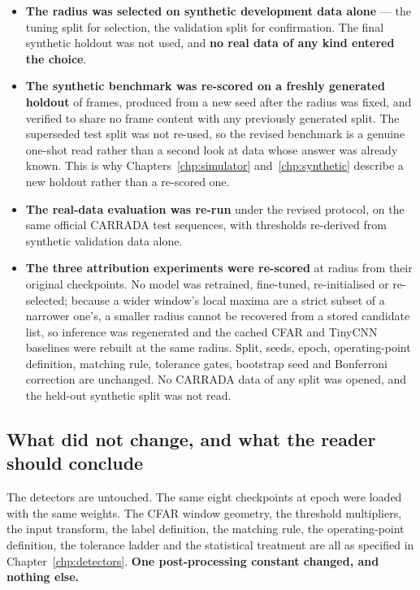 \begin{itemize}
\itemsep2pt
\item \textbf{The radius was selected on synthetic development data alone} --- the tuning split for
selection, the validation split for confirmation. The final synthetic holdout was not used, and
\textbf{no real data of any kind entered the choice}.
\item \textbf{The synthetic benchmark was re-scored on a freshly generated holdout} of
\SynHoldoutFrames{} frames, produced from a new seed after the radius was fixed, and verified to
share no frame content with any previously generated split. The superseded test split was not
re-used, so the revised benchmark is a genuine one-shot read rather than a second look at data whose
answer was already known. This is why Chapters~\ref{chp:simulator} and~\ref{chp:synthetic} describe a
new holdout rather than a re-scored one.
\item \textbf{The real-data evaluation was re-run} under the revised protocol, on the same official
CARRADA test sequences, with thresholds re-derived from synthetic validation data alone.
\item \textbf{The three attribution experiments were re-scored} at radius \ProtocolNms{} from their
original checkpoints. No model was retrained, fine-tuned, re-initialised or re-selected; because a
wider window's local maxima are a strict subset of a narrower one's, a smaller radius cannot be
recovered from a stored candidate list, so inference was regenerated and the cached CFAR and TinyCNN
baselines were rebuilt at the same radius. Split, seeds, epoch, operating-point definition, matching
rule, tolerance gates, bootstrap seed and Bonferroni correction are unchanged. No CARRADA data of any
split was opened, and the held-out synthetic split was not read.
\label{app:attribrescore}
\end{itemize}

\subsection*{What did not change, and what the reader should conclude}

The detectors are untouched. The same eight checkpoints at epoch \TinyEpochs{} were loaded with the
same weights. The CFAR window geometry, the threshold multipliers, the input transform, the label
definition, the matching rule, the operating-point definition, the tolerance ladder and the
statistical treatment are all as specified in Chapter~\ref{chp:detectors}. \textbf{One
post-processing constant changed, and nothing else.}

